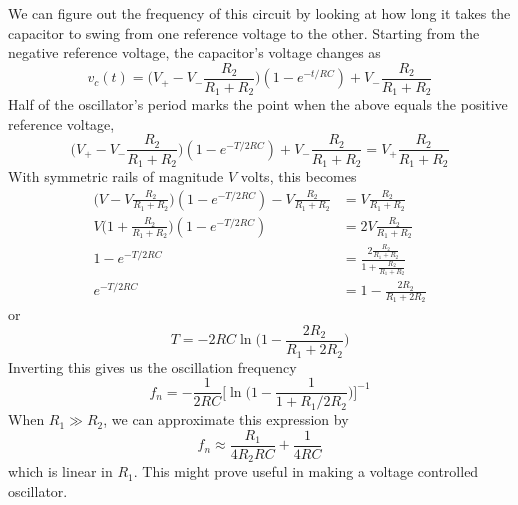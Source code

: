 \documentclass{article}
\begin{document}
	We can figure out the frequency of this circuit by looking at how long it takes the capacitor to swing from one reference voltage to the other. Starting from the negative reference voltage, the capacitor's voltage changes as
	\[
		v_c(t) = \Big(V_+ - V_-\frac{R_2}{R_1+R_2}\Big)(1 - e^{-t/RC})  + V_-\frac{R_2}{R_1+R_2}
	\]
	Half of the oscillator's period marks the point when the above equals the positive reference voltage,
	\[
		\Big(V_+ - V_-\frac{R_2}{R_1+R_2}\Big)(1 - e^{-T/2RC})  + V_-\frac{R_2}{R_1+R_2} = V_+\frac{R_2}{R_1+R_2}
	\]
	With symmetric rails of magnitude $V$ volts, this becomes
	\begin{align*}
	\Big(V - V\frac{R_2}{R_1+R_2}\Big)(1 - e^{-T/2RC}) - V\frac{R_2}{R_1+R_2} &= V\frac{R_2}{R_1+R_2} \\
	V\Big(1 + \frac{R_2}{R_1+R_2}\Big)(1 - e^{-T/2RC}) &= 2V\frac{R_2}{R_1+R_2} \\
	1 - e^{-T/2RC} &= \frac{2\frac{R_2}{R_1+R_2}}{1 + \frac{R_2}{R_1+R_2}} \\
	e^{-T/2RC} &= 1 - \frac{2R_2}{R_1 + 2R_2}
	\end{align*}
	or
	\[
		T = -2RC\ln\Big(1 - \frac{2R_2}{R_1 + 2R_2}\Big)
	\]
	Inverting this gives us the oscillation frequency
	\[
		f_n = -\frac{1}{2RC}\Big[\ln\Big(1 - \frac{1}{1 + R_1/2R_2}\Big)\Big]^{-1}
	\]
	When $R_1 \gg R_2$, we can approximate this expression by
	\[
		f_n \approx \frac{R_1}{4R_2RC} + \frac{1}{4RC}
	\]
	which is linear in $R_1$. This might prove useful in making a voltage controlled oscillator.
	
\end{document}
